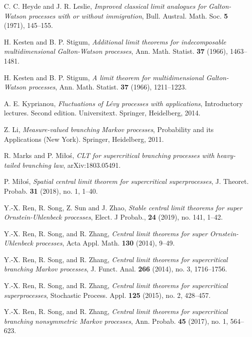 \documentclass[12pt,a4paper]{amsart}
\theoremstyle{plain}
\theoremstyle{definition}
\numberwithin{equation}{section}
\begin{document}
\begin{thebibliography}{10}
  	C. C. Heyde and J. R. Leslie,
  	\emph{Improved classical limit analogues for {G}alton-{W}atson processes with or without immigration},
  	Bull. Austral. Math. Soc. \textbf{5} (1971), 145--155.

  	H. Kesten and B. P. Stigum,
  	\emph{Additional limit theorems for indecomposable multidimensional {G}alton-{W}atson processes},
  	Ann. Math. Statist. \textbf{37} (1966), 1463--1481.

 	H. Kesten and B. P. Stigum,
  	\emph{A limit theorem for multidimensional {G}alton-{W}atson processes},
  	Ann. Math. Statist. \textbf{37} (1966), 1211--1223.

  	A. E. Kyprianou,
  	\emph{Fluctuations of {L}\'{e}vy processes with applications},
    Introductory lectures. Second edition. Universitext. Springer, Heidelberg, 2014.

  	Z. Li,
  	\emph{Measure-valued branching {M}arkov processes},
  	Probability and its Applications (New York). Springer, Heidelberg, 2011.

  	R. Marks and P. Mi{\l}o{\'s},
  	\emph{C{LT} for supercritical branching processes with heavy-tailed branching law},
  	arXiv:1803.05491.


  	P. Mi{\l}o{\'s},
  	\emph{Spatial central limit theorem for supercritical superprocesses},
  	J. Theoret. Probab. \textbf{31} (2018), no. 1, 1--40.

	Y.-X. Ren, R. Song, Z. Sun and J. Zhao,
	\emph{Stable central limit theorems for super Ornstein-Uhlenbeck processes},
	Elect. J Probab., \textbf{24} (2019), no. 141, 1--42.

  	Y.-X. Ren, R. Song, and R. Zhang,
  	\emph{Central limit theorems for super {O}rnstein-{U}hlenbeck processes},
  	Acta Appl. Math. \textbf{130} (2014), 9--49.

  	Y.-X. Ren, R. Song, and R. Zhang,
  	\emph{Central limit theorems for supercritical branching {M}arkov processes},
  	J. Funct. Anal. \textbf{266} (2014), no. 3, 1716--1756.

  	Y.-X. Ren, R. Song, and R. Zhang,
  	\emph{Central limit theorems for supercritical superprocesses},
  	Stochastic Process. Appl. \textbf{125} (2015), no. 2, 428--457.

  	Y.-X. Ren, R. Song, and R. Zhang,
  	\emph{Central limit theorems for supercritical branching nonsymmetric {M}arkov processes},
  	Ann. Probab. \textbf{45} (2017), no. 1, 564--623.

\end{thebibliography}
\end{document}
